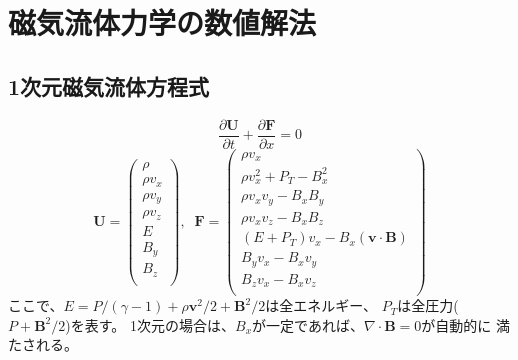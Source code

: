 \chapter{ 磁気流体力学の数値解法}\label{chap:mhd}


\section{1次元磁気流体方程式}

\begin{equation}
    \frac{\partial \bm{ U}}{\partial t} 
    + \frac{\partial \bm{ F}}{\partial x}=0
\end{equation}
\begin{equation}
    \bm{ U} = \left( 
        \begin{array}{c}
            \rho \\
            \rho v_x \\
            \rho v_y \\
            \rho v_z \\
            E\\
            B_y \\
            B_z \\
    \end{array}
\right),\;\;
    \bm{ F} = \left( 
        \begin{array}{c}
            \rho v_x \\
            \rho v_x^2 + P_T - B_x^2 \\
            \rho v_x v_y  - B_x B_y \\
            \rho v_x v_z  - B_x B_z \\
            (E + P_T)v_x - B_x (\bm{ v}\cdot\bm{ B}) \\
            B_y v_x - B_x v_y\\
            B_z v_x - B_x v_z\\
    \end{array}
\right)
\end{equation}
ここで、$E=P/(\gamma-1) + \rho \bm{ v}^2/2 + \bm{ B}^2/2$は全エネルギー、
$P_T$は全圧力($P+\bm{ B}^2/2$)を表す。
1次元の場合は、$B_x$が一定であれば、$\nabla \cdot \bm{ B}=0$が自動的に
満たされる。

\clearpage
